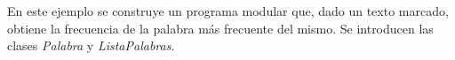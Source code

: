 En este ejemplo se construye un programa modular que, dado un texto marcado, obtiene la frecuencia de la palabra más frecuente del mismo. Se introducen las clases {\itshape  Palabra} y {\itshape  Lista\-Palabras}. 